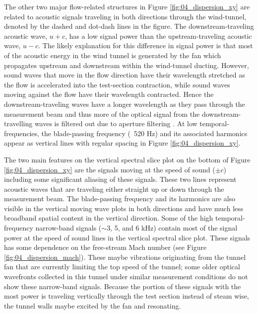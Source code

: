 The other two major flow-related structures in Figure \ref{fig:04_dispersion_xy} are related to acoustic signals traveling in both directions through the wind-tunnel, denoted by the dashed and dot-dash lines in the figure.
The downstream-traveling acoustic wave, $u+c$, has a low signal power than the upstream-traveling acoustic wave, $u-c$.
The likely explanation for this difference in signal power is that most of the acoustic energy in the wind tunnel is generated by the fan which propagates upstream and downstream within the wind-tunnel ducting.
However, sound waves that move in the flow direction have their wavelength stretched as the flow is accelerated into the test-section contraction, while sound waves moving against the flow have their wavelength contracted.
Hence the downstream-traveling waves have a longer wavelength as they pass through the measurement beam and thus more of the optical signal from the downstream-travelling waves is filtered out due to aperture filtering \cite{Siegenthaler-2008-9Yutbt6c}.
At low temporal-frequencies, the blade-passing frequency (~520 Hz) and its associated harmonics appear as vertical lines with regular spacing in Figure \ref{fig:04_dispersion_xy}.

The two main features on the vertical spectral slice plot on the bottom of Figure \ref{fig:04_dispersion_xy} are the signals moving at the speed of sound ($\pm c$) including some significant aliasing of these signals.
These two lines represent acoustic waves that are traveling either straight up or down through the measurement beam.
The blade-passing frequency and its harmonics are also visible in the vertical moving wave plots in both directions and have much less broadband spatial content in the vertical direction.
Some of the high temporal-frequency narrow-band signals ($\sim$3, 5, and 6 kHz) contain most of the signal power at the speed of sound lines in the vertical spectral slice plot.
These signals has some dependence on the free-stream Mach number (see Figure \ref{fig:04_dispersion_mach}).
These maybe vibrations originating from the tunnel fan that are currently limiting the top speed of the tunnel; some older optical wavefronts collected in this tunnel under similar measurement conditions do not show these narrow-band signals.
Because the portion of these signals with the most power is traveling vertically through the test section instead of steam wise, the tunnel walls maybe excited by the fan and resonating.

